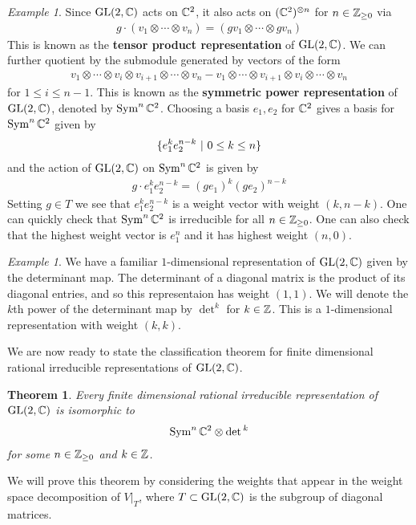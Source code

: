 \documentclass{amsart}
\numberwithin{equation}{section}
\theoremstyle{plain} %
\newtheorem{theorem}[equation]{Theorem}
\theoremstyle{definition}
\theoremstyle{remark}
\newtheorem{example}[equation]{Example}
\begin{document}
\begin{example}
	Since $\operatorname{GL}(2,\mathbb{C})$ acts on $\mathbb{C}^2$, it also acts on $(\mathbb{C}^2)^{\otimes n}$ for $n\in \mathbb{Z}_{\geq 0}$ via \begin{align*}
		g\cdot (v_1\otimes \cdots \otimes v_n) = (gv_1\otimes \cdots \otimes gv_n)
	\end{align*} This is known as the \textbf{tensor product representation} of $\operatorname{GL}(2,\mathbb{C})$. We can further
	quotient by the submodule generated by vectors of the form \begin{align*}
		v_1\otimes \cdots \otimes v_i \otimes v_{i+1} \otimes \cdots \otimes v_n - v_1\otimes \cdots \otimes v_{i+1} \otimes v_i \otimes \cdots \otimes v_n
	\end{align*} for $1\leq i \leq n-1$. This is known as the \textbf{symmetric power representation} of $\operatorname{GL}(2,\mathbb{C})$, denoted by $\operatorname{Sym}^n\mathbb{C}^2$.
	Choosing a basis $e_1,e_2$ for $\mathbb{C}^2$ gives a basis for $\operatorname{Sym}^n\mathbb{C}^2$ given by \begin{align*}
		\{e_1^ke_2^{n-k} \ \vert \  0\leq k \leq n\}
	\end{align*} and the action of $\operatorname{GL}(2,\mathbb{C})$ on $\operatorname{Sym}^n\mathbb{C}^2$ is given by \begin{align*}
		g\cdot e_1^ke_2^{n-k} = (ge_1)^k(ge_2)^{n-k}
	\end{align*} Setting $g\in T$ we see that $e_1^ke_2^{n-k}$ is a weight vector with weight $(k,n-k)$. One
	can quickly check that $\operatorname{Sym}^n\mathbb{C}^2$ is irreducible for all $n\in \mathbb{Z}_{\geq 0}$. One can also check
	that the highest weight vector is $e_1^n$ and it has highest weight $(n,0)$.
\end{example}

\begin{example}
	We have a familiar $1$-dimensional representation of $\operatorname{GL}(2,\mathbb{C})$ given by the determinant map. The determinant of a diagonal matrix is the product of its diagonal entries,
	and so this representaion has weight $(1,1)$. We will denote
	the $k$th power of the determinant map by $\det^k$ for $k\in\mathbb{Z}$. This is a $1$-dimensional representation with weight $(k,k)$.
\end{example}

We are now ready to state the classification theorem for finite dimensional rational irreducible representations of $\operatorname{GL}(2,\mathbb{C})$.
\begin{theorem}
	Every finite dimensional rational irreducible representation of $\operatorname{GL}(2,\mathbb{C})$ is isomorphic to \begin{align*}
		\operatorname{Sym}^n\mathbb{C}^2 \otimes \det{}^k
	\end{align*} for some $n\in \mathbb{Z}_{\geq 0}$ and $k\in \mathbb{Z}$.
\end{theorem}
We will prove this theorem by considering the weights that appear in the weight space decomposition of $V\vert_{T}$, where $T\subset \operatorname{GL}(2,\mathbb{C})$ is the subgroup of diagonal matrices.
\end{document}
